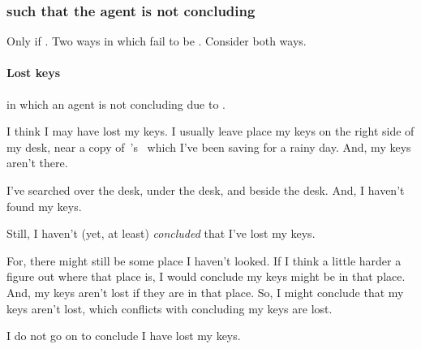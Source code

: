 \subsubsection{ such that the agent is not concluding}

\begin{note}
  Only if \fc{}.
  Two ways in which fail to be \fc{}.
  Consider both ways.
\end{note}

\paragraph*{Lost keys}

\begin{note}
   in which an agent is not concluding due to \requ{}.
\end{note}

\begin{note}
  \begin{illustration}%
    \label{illu:lost-key}%
    I think I may have lost my keys.
    I usually leave place my keys on the right side of my desk, near a copy of~\citeauthor{Vickers:1989tr}'s~ which I've been saving for a rainy day.
    And, my keys aren't there.

    I've searched over the desk, under the desk, and beside the desk.
    And, I haven't found my keys.

    Still, I haven't (yet, at least) \emph{concluded} that I've lost my keys.

    For, there might still be some place I haven't looked.
    If I think a little harder a figure out where that place is, I would conclude my keys might be in that place.
    And, my keys aren't lost if they are in that place.
    So, I might conclude that my keys aren't lost, which conflicts with concluding my keys are lost.

    I do not go on to conclude I have lost my keys.
  \end{illustration}
\end{note}

